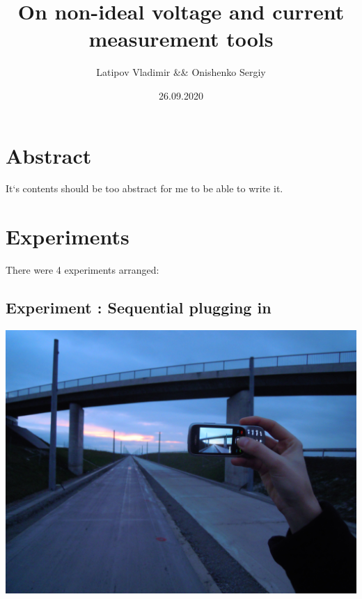 \documentclass[11pt]{article}
\title{On non-ideal voltage and current measurement tools}
\date{26.09.2020}
\author{Latipov Vladimir \&\& Onishenko Sergiy}
\begin{document}
    \maketitle
    \newpage

    \section{Abstract}\label{sec:abstract}
    It`s contents should be too abstract for me to be able to write it.

    \section{Experiments}\label{sec:experiments}
    There were 4 experiments arranged:

        \subsection{Experiment : Sequential plugging in}\label{subsec:experiment-1} %
    \includegraphics[width=\linewidth]{images/schemes/scheme0.png}
\end{document}
